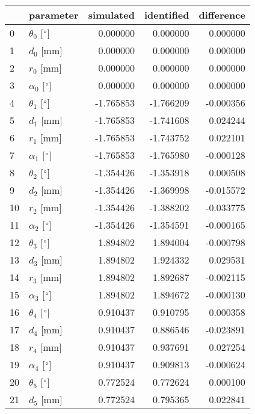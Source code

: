 \documentclass{standalone}%
\begin{document}
%
\normalsize%
\begin{tabular}{llrrr}
\toprule
{} &                 parameter & simulated & identified & difference \\
\midrule
0  &  $\theta_{0}$ [$\degree$] &  0.000000 &   0.000000 &   0.000000 \\
1  &              $d_{0}$ [mm] &  0.000000 &   0.000000 &   0.000000 \\
2  &              $r_{0}$ [mm] &  0.000000 &   0.000000 &   0.000000 \\
3  &  $\alpha_{0}$ [$\degree$] &  0.000000 &   0.000000 &   0.000000 \\
4  &  $\theta_{1}$ [$\degree$] & -1.765853 &  -1.766209 &  -0.000356 \\
5  &              $d_{1}$ [mm] & -1.765853 &  -1.741608 &   0.024244 \\
6  &              $r_{1}$ [mm] & -1.765853 &  -1.743752 &   0.022101 \\
7  &  $\alpha_{1}$ [$\degree$] & -1.765853 &  -1.765980 &  -0.000128 \\
8  &  $\theta_{2}$ [$\degree$] & -1.354426 &  -1.353918 &   0.000508 \\
9  &              $d_{2}$ [mm] & -1.354426 &  -1.369998 &  -0.015572 \\
10 &              $r_{2}$ [mm] & -1.354426 &  -1.388202 &  -0.033775 \\
11 &  $\alpha_{2}$ [$\degree$] & -1.354426 &  -1.354591 &  -0.000165 \\
12 &  $\theta_{3}$ [$\degree$] &  1.894802 &   1.894004 &  -0.000798 \\
13 &              $d_{3}$ [mm] &  1.894802 &   1.924332 &   0.029531 \\
14 &              $r_{3}$ [mm] &  1.894802 &   1.892687 &  -0.002115 \\
15 &  $\alpha_{3}$ [$\degree$] &  1.894802 &   1.894672 &  -0.000130 \\
16 &  $\theta_{4}$ [$\degree$] &  0.910437 &   0.910795 &   0.000358 \\
17 &              $d_{4}$ [mm] &  0.910437 &   0.886546 &  -0.023891 \\
18 &              $r_{4}$ [mm] &  0.910437 &   0.937691 &   0.027254 \\
19 &  $\alpha_{4}$ [$\degree$] &  0.910437 &   0.909813 &  -0.000624 \\
20 &  $\theta_{5}$ [$\degree$] &  0.772524 &   0.772624 &   0.000100 \\
21 &              $d_{5}$ [mm] &  0.772524 &   0.795365 &   0.022841 \\

\end{tabular}
\end{document}
